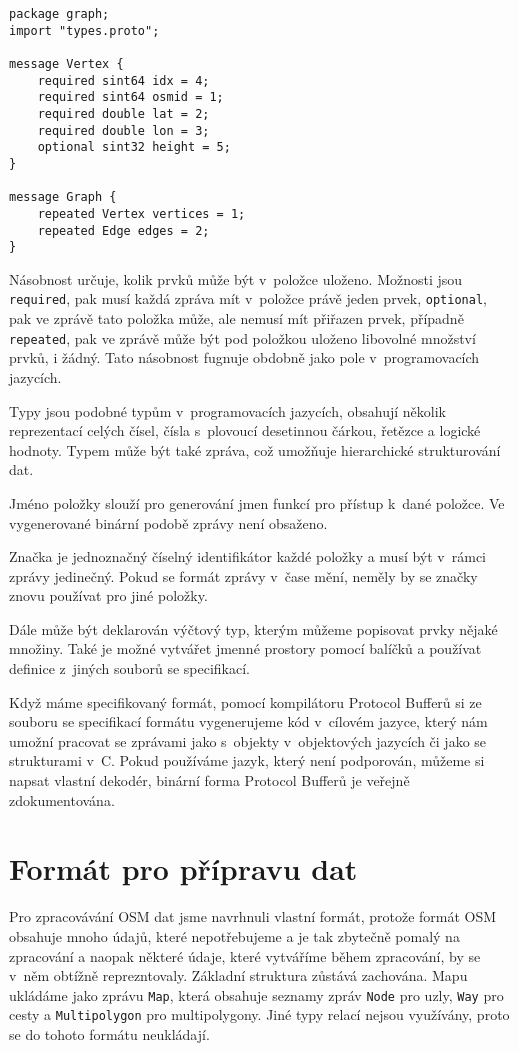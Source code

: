 \begin{verbatim}
package graph;
import "types.proto";

message Vertex {
    required sint64 idx = 4;
    required sint64 osmid = 1;
    required double lat = 2;
    required double lon = 3;
    optional sint32 height = 5;
}

message Graph {
    repeated Vertex vertices = 1;
    repeated Edge edges = 2;
}
\end{verbatim}

{\tuc Násobnost} určuje, kolik prvků může být v~položce uloženo. Možnosti jsou
\verb|required|, pak musí každá zpráva mít v~položce právě jeden prvek,
\verb|optional|, pak ve zprávě tato položka může, ale nemusí mít přiřazen prvek,
případně \verb|repeated|, pak ve zprávě může být pod položkou uloženo libovolné
množství prvků, i žádný. Tato násobnost fugnuje obdobně jako pole
v~programovacích jazycích. 

\smallskip
{\tuc Typy} jsou podobné typům v~programovacích jazycích, obsahují několik
reprezentací celých čísel, čísla s~plovoucí desetinnou čárkou, řetězce a logické
hodnoty. Typem může být také zpráva, což umožňuje hierarchické strukturování
dat. 

\smallskip
{\tuc Jméno} položky slouží pro generování jmen funkcí pro přístup k~dané
položce. Ve vygenerované binární podobě zprávy není obsaženo. 

\smallskip
{\tuc Značka} je jednoznačný číselný identifikátor každé položky a musí být v~rámci
zprávy jedinečný. Pokud se formát zprávy v~čase mění, neměly by se značky znovu
používat pro jiné položky.

Dále může být deklarován výčtový typ, kterým můžeme popisovat prvky nějaké
množiny. Také je možné vytvářet jmenné prostory pomocí balíčků a používat
definice z~jiných souborů se specifikací.

Když máme specifikovaný formát, pomocí kompilátoru Protocol Bufferů si ze
souboru se specifikací formátu vygenerujeme kód v~cílovém jazyce, který nám
umožní pracovat se zprávami jako s~objekty v~objektových jazycích či jako se
strukturami v~C. Pokud používáme jazyk, který není podporován, můžeme si napsat
vlastní dekodér, binární forma Protocol Bufferů je veřejně
zdokumentována.\cite{pbfenc}

\section{Formát pro přípravu dat}
Pro zpracovávání OSM dat jsme navrhnuli vlastní formát, protože formát OSM
obsahuje mnoho údajů, které nepotřebujeme a je tak zbytečně pomalý na zpracování
a naopak některé údaje, které vytváříme během zpracování, by se v~něm obtížně
reprezntovaly. Základní struktura zůstává zachována. Mapu ukládáme jako zprávu
\verb|Map|, která obsahuje seznamy zpráv \verb|Node| pro uzly, \verb|Way| pro
cesty a \verb|Multipolygon| pro multipolygony. Jiné typy relací nejsou
využívány, proto se do tohoto formátu neukládají.

